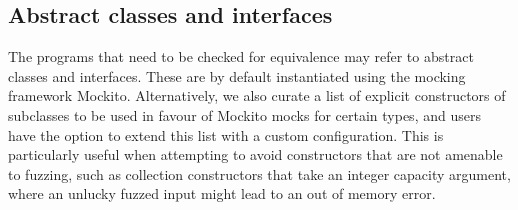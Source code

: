\documentclass[conference]{IEEEtran}
\begin{document}

\subsection{Abstract classes and interfaces}\label{sec:abstract}

The programs that need to be checked for equivalence may refer to
abstract classes and interfaces. These are by default instantiated
using the mocking framework Mockito.
%
Alternatively, we also curate a
list of explicit constructors
of subclasses to be used in favour of Mockito mocks for certain types, and users
have the option to extend this list with a custom configuration.
%
This is particularly useful when attempting to avoid constructors that are not amenable to fuzzing, such as
collection constructors that take an integer capacity argument, where an
unlucky fuzzed input might lead to an out of memory error.




\end{document}

